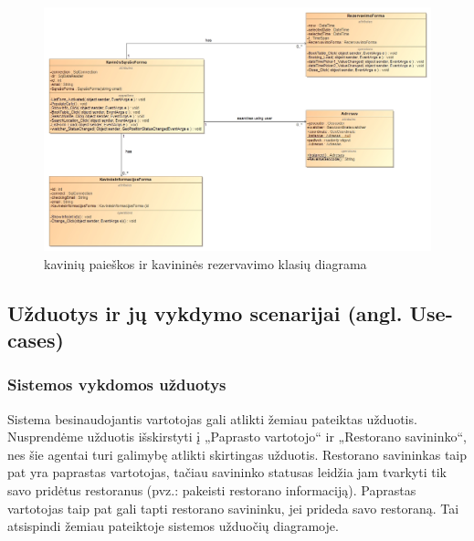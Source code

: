 \documentclass{VUMIFPSkursinis}
\begin{document}
\begin{figure}[H]
    \centering
    \includegraphics[width=\textwidth,height=\textheight,keepaspectratio]{img/LoginForm_Address_Booking} 
    \caption{kavinių paieškos ir kavininės rezervavimo klasių diagrama}
    \label{img:LoginForm_Address_Booking}
\end{figure}
\pagebreak
\subsection{Užduotys ir jų vykdymo scenarijai (angl. Use-cases)}
\subsubsection{Sistemos vykdomos užduotys}

Sistema besinaudojantis vartotojas gali atlikti žemiau pateiktas užduotis. Nusprendėme užduotis išskirstyti į „Paprasto vartotojo“ ir „Restorano savininko“, nes šie agentai turi galimybę atlikti skirtingas užduotis. Restorano savininkas taip pat yra paprastas vartotojas, tačiau savininko statusas leidžia jam tvarkyti tik savo pridėtus restoranus (pvz.: pakeisti restorano informaciją). Paprastas vartotojas taip pat gali tapti restorano savininku, jei prideda savo restoraną. Tai atsispindi žemiau pateiktoje sistemos užduočių diagramoje.
\end{document}

